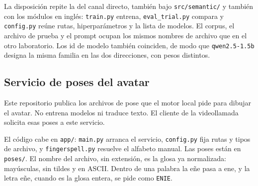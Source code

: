 La disposición repite la del canal directo, también bajo \texttt{src/semantic/} y también con los módulos en inglés: \texttt{train.py} entrena, \texttt{eval\_trial.py} compara y \texttt{config.py} reúne rutas, hiperparámetros y la lista de modelos. El corpus, el archivo de prueba y el prompt ocupan los mismos nombres de archivo que en el otro laboratorio. Los id de modelo también coinciden, de modo que \texttt{qwen2.5-1.5b} designa la misma familia en las dos direcciones, con pesos distintos.

\subsection{Servicio de poses del avatar}
Este repositorio publica los archivos de pose que el motor local pide para dibujar el avatar. No entrena modelos ni traduce texto. El cliente de la videollamada solicita esas poses a este servicio.

El código cabe en \texttt{app/}: \texttt{main.py} arranca el servicio, \texttt{config.py} fija rutas y tipos de archivo, y \texttt{fingerspell.py} resuelve el alfabeto manual. Las poses están en \texttt{poses/}. El nombre del archivo, sin extensión, es la glosa ya normalizada: mayúsculas, sin tildes y en ASCII. Dentro de una palabra la eñe pasa a ene, y la letra eñe, cuando es la glosa entera, se pide como \texttt{ENIE}.
